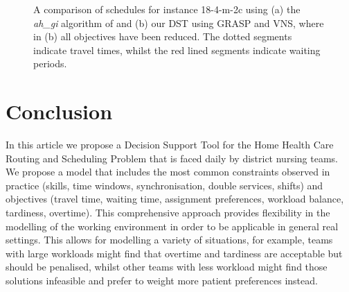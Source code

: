 \documentclass[a4paper,11pt,authoryear]{elsarticle}
\begin{document}
\begin{figure}[h!]
	\centering	
	\begin{subfigure}[h]{\textwidth}
		\centering
		
		\caption{}
		\label{fig:aith}
		\vspace{2mm}
	\end{subfigure}
	\begin{subfigure}[h]{\textwidth}
		\centering
		
		\caption{}
		\label{fig:dst}
	\end{subfigure}
	\caption{A comparison of schedules for instance 18-4-m-2c using (a) the \textit{ah\_gi} algorithm of \cite{aithaddadene2016} and (b) our DST using GRASP and VNS, where in (b) all objectives have been reduced. The dotted segments indicate travel times, whilst the red lined segments indicate waiting periods.}
	\label{fig:18-4-l-2agantt}
\end{figure}



\section{Conclusion}
\label{sec:conclusion}
\noindent In this article we propose a Decision Support Tool for the Home Health Care Routing and Scheduling Problem that is faced daily by district nursing teams. We propose a model that includes the most common constraints observed in practice (skills, time windows, synchronisation, double services, shifts) and objectives (travel time, waiting time, assignment preferences, workload balance, tardiness, overtime). This comprehensive approach provides flexibility in the modelling of the working environment in order to be applicable in general real settings. This allows for modelling a variety of situations, for example, teams with large workloads might find that overtime and tardiness are acceptable but should be penalised, whilst other teams with less workload might find those solutions infeasible and prefer to weight more patient preferences instead.
\end{document}
